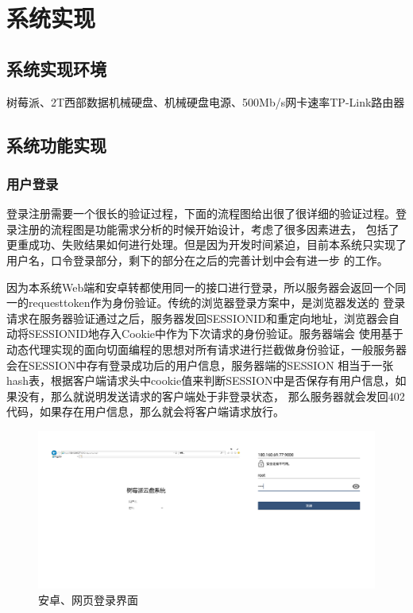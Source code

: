 \section{系统实现}
\subsection{系统实现环境}
树莓派、2T西部数据机械硬盘、机械硬盘电源、500Mb/s网卡速率TP-Link路由器
\subsection{系统功能实现}

\subsubsection{用户登录}
登录注册需要一个很长的验证过程，下面的流程图给出很了很详细的验证过程。登录注册的流程图是功能需求分析的时候开始设计，考虑了很多因素进去，
包括了更重成功、失败结果如何进行处理。但是因为开发时间紧迫，目前本系统只实现了用户名，口令登录部分，剩下的部分在之后的完善计划中会有进一步
的工作。

因为本系统Web端和安卓转都使用同一的接口进行登录，所以服务器会返回一个同一的requesttoken作为身份验证。传统的浏览器登录方案中，是浏览器发送的
登录请求在服务器验证通过之后，服务器发回SESSIONID和重定向地址，浏览器会自动将SESSIONID地存入Cookie中作为下次请求的身份验证。服务器端会
使用基于动态代理实现的面向切面编程的思想对所有请求进行拦截做身份验证，一般服务器会在SESSION中存有登录成功后的用户信息，服务器端的SESSION
相当于一张hash表，根据客户端请求头中cookie值来判断SESSION中是否保存有用户信息，如果没有，那么就说明发送请求的客户端处于非登录状态，
那么服务器就会发回402代码，如果存在用户信息，那么就会将客户端请求放行。

\begin{figure}[H]
  \centering
  \includegraphics[width=130mm]{./figures/android_web_login.png}
  \caption{安卓、网页登录界面}
\end{figure}

